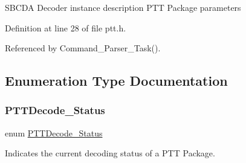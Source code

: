 S\+B\+C\+DA Decoder instance description P\+TT Package parameters 

Definition at line 28 of file ptt.\+h.



Referenced by Command\+\_\+\+Parser\+\_\+\+Task().



\subsection{Enumeration Type Documentation}
\mbox{\label{group___p_t_t___service_ga26a2a479755f5b679cd4ac31c4f18452}} 
\subsubsection{\texorpdfstring{P\+T\+T\+Decode\+\_\+\+Status}{PTTDecode\_Status}}
{\footnotesize\ttfamily enum \hyperlink{group___p_t_t___service_ga26a2a479755f5b679cd4ac31c4f18452}{P\+T\+T\+Decode\+\_\+\+Status}}



Indicates the current decoding status of a P\+TT Package. 

